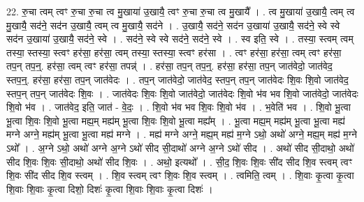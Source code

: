 \documentclass[17pt]{extarticle}
\begin{document}
22. रु॒चा त्वम् त्वꣳ रु॒चा रु॒चा त्व मु॒खाया॑ उ॒खायै॒ त्वꣳ रु॒चा रु॒चा त्व मु॒खायै᳚ । . त्व मु॒खाया॑ उ॒खायै॒ त्वम् त्व मु॒खायै॒ सद॑ने॒ सद॑न उ॒खायै॒ त्वम् त्व मु॒खायै॒ सद॑ने । . उ॒खायै॒ सद॑ने॒ सद॑न उ॒खाया॑ उ॒खायै॒ सद॑ने॒ स्वे स्वे सद॑न उ॒खाया॑ उ॒खायै॒ सद॑ने॒ स्वे । . सद॑ने॒ स्वे स्वे सद॑ने॒ सद॑ने॒ स्वे । . स्व इति॒ स्वे । . तस्या॒ स्त्वम् त्वम् तस्या॒ स्तस्या॒ स्त्वꣳ हर॑सा॒ हर॑सा॒ त्वम् तस्या॒ स्तस्या॒ स्त्वꣳ हर॑सा । . त्वꣳ हर॑सा॒ हर॑सा॒ त्वम् त्वꣳ हर॑सा॒ तप॒न् तप॒न्॒. हर॑सा॒ त्वम् त्वꣳ हर॑सा॒ तपन्न्॑ । . हर॑सा॒ तप॒न् तप॒न्॒. हर॑सा॒ हर॑सा॒ तप॒न् जात॑वेदो॒ जात॑वेद॒ स्तप॒न्॒. हर॑सा॒ हर॑सा॒ तप॒न् जात॑वेदः । . तप॒न् जात॑वेदो॒ जात॑वेद॒ स्तप॒न् तप॒न् जात॑वेदः शि॒वः शि॒वो जात॑वेद॒ स्तप॒न् तप॒न् जात॑वेदः शि॒वः । . जात॑वेदः शि॒वः शि॒वो जात॑वेदो॒ जात॑वेदः शि॒वो भ॑व भव शि॒वो जात॑वेदो॒ जात॑वेदः शि॒वो भ॑व । . जात॑वेद॒ इति॒ जात॑ - वे॒दः॒ । . शि॒वो भ॑व भव शि॒वः शि॒वो भ॑व । . भ॒वेति॑ भव । . शि॒वो भू॒त्वा भू॒त्वा शि॒वः शि॒वो भू॒त्वा मह्य॒म् मह्य॑म् भू॒त्वा शि॒वः शि॒वो भू॒त्वा मह्य᳚म् । . भू॒त्वा मह्य॒म् मह्य॑म् भू॒त्वा भू॒त्वा मह्य॑ मग्ने अग्ने॒ मह्य॑म् भू॒त्वा भू॒त्वा मह्य॑ मग्ने । . मह्य॑ मग्ने अग्ने॒ मह्य॒म् मह्य॑ म॒ग्ने ऽथो॒ अथो॑ अग्ने॒ मह्य॒म् मह्य॑ म॒ग्ने ऽथो᳚ । . अ॒ग्ने ऽथो॒ अथो॑ अग्ने अ॒ग्ने ऽथो॑ सीद सी॒दाथो॑ अग्ने अ॒ग्ने ऽथो॑ सीद । . अथो॑ सीद सी॒दाथो॒ अथो॑ सीद शि॒वः शि॒वः सी॒दाथो॒ अथो॑ सीद शि॒वः । . अथो॒ इत्यथो᳚ । . सी॒द॒ शि॒वः शि॒वः सी॑द सीद शि॒व स्त्वम् त्वꣳ शि॒वः सी॑द सीद शि॒व स्त्वम् । . शि॒व स्त्वम् त्वꣳ शि॒वः शि॒व स्त्वम् । . त्वमिति॒ त्वम् । . शि॒वाः कृ॒त्वा कृ॒त्वा शि॒वाः शि॒वाः कृ॒त्वा दिशो॒ दिशः॑ कृ॒त्वा शि॒वाः शि॒वाः कृ॒त्वा दिशः॑ । \newline
\end{document}
